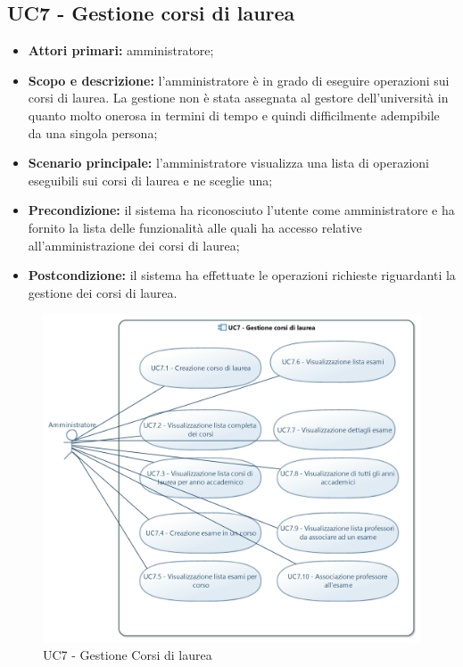 \documentclass[AnalisiDeiRequisiti.tex]{subfiles}
\begin{document}
\subsection{UC7 - Gestione corsi di laurea}
\begin{itemize}
	\item \textbf{Attori primari:} amministratore;
	\item \textbf{Scopo e descrizione:} l'amministratore è in grado di eseguire operazioni sui corsi di laurea. La gestione non è stata assegnata al gestore dell'università in quanto molto onerosa in termini di tempo e quindi difficilmente adempibile da una singola persona;
	\item \textbf{Scenario principale:} l'amministratore visualizza una lista di operazioni eseguibili sui corsi di laurea e ne sceglie una;
	\item \textbf{Precondizione:} il sistema ha riconosciuto l'utente come amministratore e ha fornito la lista delle funzionalità alle quali ha accesso relative all'amministrazione dei corsi di laurea;
	\item \textbf{Postcondizione:} il sistema ha effettuate le operazioni richieste riguardanti la gestione dei corsi di laurea.
\end{itemize}

\begin{figure}[H]
	\centering
	\includegraphics[width=1.1\linewidth]{UC7.jpg}
	\caption{UC7 - Gestione Corsi di laurea}
	\label{fig:UC7 - Gestione Corsi di laurea}
\end{figure}
\end{document}

